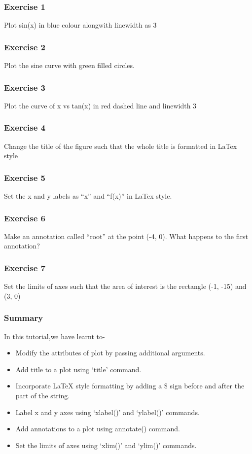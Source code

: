 \documentclass[presentation]{beamer}
\begin{document}
\begin{frame}
\frametitle{Exercise 1}
\label{sec-4}

  Plot sin(x) in blue colour alongwith linewidth as 3
\end{frame}
\begin{frame}
\frametitle{Exercise 2}
\label{sec-5}

  Plot the sine curve with green filled circles.
\end{frame}
\begin{frame}
\frametitle{Exercise 3}
\label{sec-6}

  Plot the curve of x vs tan(x) in red dashed line and linewidth 3
\end{frame}
\begin{frame}
\frametitle{Exercise 4}
\label{sec-7}

  Change the title of the figure such that the whole title is
  formatted in LaTex style
\end{frame}
\begin{frame}
\frametitle{Exercise 5}
\label{sec-8}

  Set the x and y labels as ``x'' and ``f(x)'' in LaTex style.
\end{frame}
\begin{frame}
\frametitle{Exercise 6}
\label{sec-9}

  Make an annotation called ``root'' at the point (-4, 0). What happens
  to the first annotation?
\end{frame}
\begin{frame}
\frametitle{Exercise 7}
\label{sec-10}

  Set the limits of axes such that the area of interest is the
  rectangle (-1, -15) and (3, 0)
\end{frame}
\begin{frame}
\frametitle{Summary}
\label{sec-11}

  In this tutorial,we have learnt to-

\begin{itemize}
\item Modify the attributes of plot by passing additional arguments.
\item Add title to a plot using `title' command.
\item Incorporate \LaTeX{} style formatting by adding a \$ sign before and after the part of the string.
\item Label x and y axes using `xlabel()' and `ylabel()' commands.
\item Add annotations to a plot using annotate() command.
\item Set the limits of axes using `xlim()' and `ylim()' commands.
\end{itemize}
\end{frame}
\end{document}
